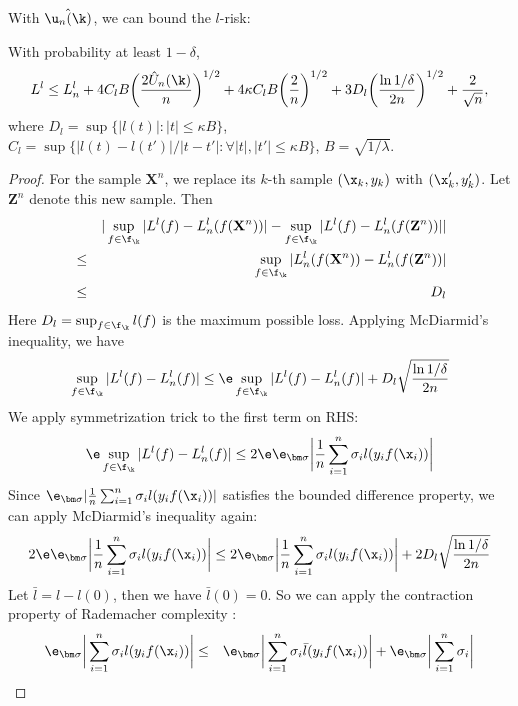 With $\hat{\u_n(\k)}$, we can bound the $l$-risk:
\begin{theorem} \label{thm:bnd-rdmchr-chaos} \cite{colt/YingC09}
With probability at least $1 - \delta$,
\[
L^{l} \leq L^{l}_n + 4C_{l}B\bigg(\frac{2\hat{U}_n(\k)}{n}\bigg)^{1/2}
 + 4\kappa C_l B\bigg(\frac{2}{n}\bigg)^{1/2} + 3D_{l}\bigg(\frac{\ln 1 / \delta}{2n}\bigg)^{1/2}
  + \frac{2}{\sqrt{n}},
\]
where $D_{l} = \sup\{|l(t)| : |t| \leq \kappa B\}$, $C_{l} = \sup\{|l(t) -
l(t')|/|t - t'|: \forall |t|,|t'| \leq \kappa B\}$, $B = \sqrt{1 / \lambda}$.
\end{theorem}
\begin{proof}
For the sample $\mathbf X^n$, we replace its $k$-th sample $(\x_k, y_k)$ with
$(\x_k', y_k')$. Let $\mathbf Z^n$ denote this new sample. Then
\begin{eqnarray}
&&| \sup_{f\in\f_\k}| L^l(f) - L^l_n(f(\mathbf X^n)) |
 - \sup_{f\in\f_\k}| L^l(f) - L^l_n(f(\mathbf Z^n)) | | \nonumber\\
&\leq&
    \sup_{f\in\f_\k}| L^l_n(f(\mathbf X^n)) - L^l_n(f(\mathbf Z^n)) | \nonumber\\
&\leq& D_l \nonumber
\end{eqnarray}
Here $D_l = \sup_{f\in\f_\k}l(f)$ is the maximum possible loss. Applying McDiarmid's inequality, we have
\begin{equation}
\sup_{f\in\f_\k}| L^l(f) - L^l_n(f) | \leq \e\sup_{f\in\f_\k}| L^l(f) - L^l_n(f) | + D_l\sqrt{\frac{\ln 1 / \delta}{2n}} \label{eqn:first-risk-rdm-chaos}
\end{equation}
We apply symmetrization trick to the first term on RHS:
\[
\e\sup_{f\in\f_\k}| L^l(f) - L_n^l(f) | \leq 2\e\e_{\bm\sigma}\bigg| \frac{1}{n}\sum_{i=1}^n\sigma_il(y_if(\x_i)) \bigg| \nonumber\\
\]
Since $\e_{\bm\sigma}| \frac{1}{n}\sum_{i=1}^n\sigma_il(y_if(\x_i)) |$ satisfies
the bounded difference property, we can apply McDiarmid's inequality again:
\[
2\e\e_{\bm\sigma}\bigg| \frac{1}{n}\sum_{i=1}^n\sigma_il(y_if(\x_i)) \bigg|
\leq 2\e_{\bm\sigma}\bigg| \frac{1}{n}\sum_{i=1}^n\sigma_il(y_if(\x_i)) \bigg| + 2D_l\sqrt{\frac{\ln 1 / \delta}{2n}}\nonumber\\
\]
Let $\bar{l} = l - l(0)$, then we have $\bar{l}(0) = 0$. So we can apply
the contraction property of Rademacher complexity \cite[Theorem
12]{jmlr/BartlettM02}:
\begin{eqnarray}
\e_{\bm\sigma}\bigg| \sum_{i=1}^n\sigma_il(y_if(\x_i)) \bigg|
&\leq& \e_{\bm\sigma}\bigg| \sum_{i=1}^n\sigma_i\bar{l}(y_if(\x_i)) \bigg| + \e_{\bm\sigma}\bigg| \sum_{i=1}^n \sigma_i \bigg| \nonumber\\

\end{eqnarray}
\end{proof}

